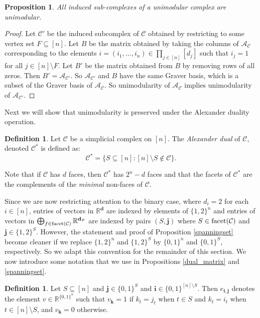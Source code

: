 \documentclass[letterpaper,12pt]{amsart}
\theoremstyle{plain}
\newtheorem{prop}[thm]{Proposition}
\theoremstyle{definition}
\newtheorem{defn}[thm]{Definition}
\theoremstyle{remark}
\newcommand{\rr}{\mathbb{R}}
\newcommand{\bfd}{\mathbf{d}}
\newcommand{\bfi}{\mathbf{i}}
\newcommand{\bfj}{\mathbf{j}}
\newcommand{\bfk}{\mathbf{k}}
\newcommand{\calc}{\mathcal{C}}
\newcommand{\facet}{\textnormal{facet}}
\begin{document}
\begin{prop}\label{induced}
	All induced sub-complexes of a unimodular complex are unimodular.
\end{prop}

\begin{proof}
	Let $\calc'$ be the induced subcomplex of $\calc$ obtained by restricting to some vertex set $F \subseteq [n]$.
	Let $B$ be the matrix obtained by taking the columns of $\mathcal{A}_{\calc}$
	corresponding to the elements  $  i = (i_1, \ldots, i_n)  \in\prod_{j \in [n]} [d_j]$ such
	that $i_j = 1$ for all $j \in [n] \setminus F$.
	{Let $B'$ be the matrix obtained from $B$ by removing rows of all zeros.
	Then $B' = \mathcal{A}_{\mathcal{C}'}$.
	So $\mathcal{A}_{\mathcal{C}'}$ and $B$ have the same Graver basis,
	which is a subset of the Graver basis of $\mathcal{A}_\calc$.
	So unimodularity of $\mathcal{A}_\calc$ implies unimodularity of $\mathcal{A}_{\calc'}$.}
\end{proof}

Next we will show that unimodularity is preserved under the Alexander duality
operation.

\begin{defn}
	Let $\mathcal{C}$ be a simplicial complex on $[n]$.  The \emph{Alexander dual} of $\mathcal{C}$, denoted $\calc^*$ is defined as:
	\[
		\mathcal{C}^*=\{S\subseteq [n] : [n]\setminus S \notin \mathcal{C}\}.
	\]
\end{defn}

Note that if $\mathcal{C}$ has $d$ faces, then $\mathcal{C}^*$ has $2^n-d$ faces
and that the facets of $\mathcal{C}^*$ are the complements of the \emph{minimal} non-faces of $\mathcal{C}$.

{
Since we are now restricting attention to the binary case, where $d_i = 2$ for each $i \in [n]$,
entries of vectors in $\rr^{\bfd}$ are indexed by elements of $\{1,2\}^n$
and entries of vectors in $\bigoplus_{f \in \facet(\mathcal{C})} \rr^{\bfd_F}$ are indexed by pairs $(S,\bfj)$
where $S \in \facet(\mathcal{C})$ and $\bfj \in \{1,2\}^{S}$.
However, the statement and proof of Proposition \ref{spanningset} become cleaner
if we replace $\{1,2\}^n$ and $\{1,2\}^S$ by $\{0,1\}^n$ and $\{0,1\}^S$, respectively.
So we adapt this convention for the remainder of this section.
We now introduce some notation that we use in Propositions \ref{dual_matrix} and \ref{spanningset}.

\begin{defn}
	Let $S \subseteq [n]$ and $\bfj \in \{0,1\}^S$ and $\bfi \in \{0,1\}^{[n]\setminus S}$.
	Then $e_{\bfi,\bfj}$ denotes the element $v \in \rr^{\{0,1\}^n}$ such that $v_{\bfk} = 1$ if $k_t = j_t$
	when $t \in S$ and $k_t = i_t$ when $t \in [n]\setminus S$, and $v_{\bfk} = 0$ otherwise.
\end{defn}
}
\end{document}
